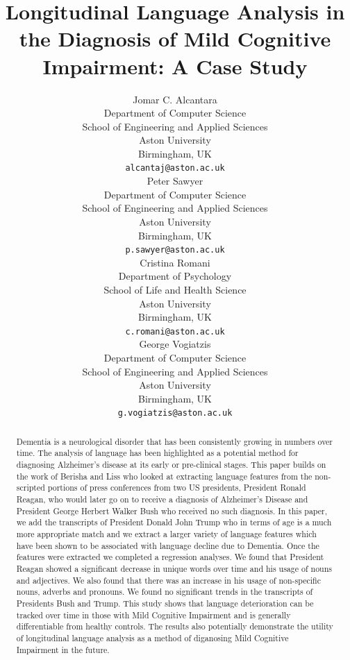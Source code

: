 \documentclass[10pt]{article}
\title{Longitudinal Language Analysis in the Diagnosis of Mild Cognitive Impairment: A Case Study}
\author{
  Jomar C. Alcantara \\
  Department of Computer Science \\
  School of Engineering and Applied Sciences\\
  Aston University\\
  Birmingham, UK \\
  \texttt{alcantaj@aston.ac.uk} \\
  \And
  Peter Sawyer \\
  Department of Computer Science \\
  School of Engineering and Applied Sciences \\
  Aston University\\
  Birmingham, UK \\
  \texttt{p.sawyer@aston.ac.uk} \\
  \And
  Cristina Romani \\
  Department of Psychology \\
  School of Life and Health Science\\
  Aston University\\
  Birmingham, UK \\
  \texttt{c.romani@aston.ac.uk} \\
  \And
  George Vogiatzis \\
  Department of Computer Science \\
  School of Engineering and Applied Sciences \\
  Aston University \\
  Birmingham, UK \\
  \texttt{g.vogiatzis@aston.ac.uk} \\
}
\begin{document}
\maketitle
\begin{abstract}
Dementia is a neurological disorder that has been consistently growing in numbers over time. The analysis of language has been highlighted as a potential method for diagnosing Alzheimer's disease at its early or pre-clinical stages. This paper builds on the work of Berisha and Liss who looked at extracting language features from the non-scripted portions of press conferences from two US presidents, President Ronald Reagan, who would later go on to receive a diagnosis of Alzheimer's Disease and President George Herbert Walker Bush who received no such diagnosis. In this paper, we add the transcripts of President Donald John Trump who in terms of age is a much more appropriate match and we extract a larger variety of language features which have been shown to be associated with language decline due to Dementia. Once the features were extracted we completed a regression analyses. We found that President Reagan showed a significant decrease in unique words over time and his usage of nouns and adjectives. We also found that there was an increase in his usage of non-specific nouns, adverbs and pronouns. We found no significant trends in the transcripts of Presidents Bush and Trump. This study shows that language deterioration can be tracked over time in those with Mild Cognitive Impairment and is generally differentiable from healthy controls. The results also potentially demonstrate the utility of longitudinal language analysis as a method of diganosing Mild Cognitive Impairment in the future.
\end{abstract}

\twocolumn
\end{document}

